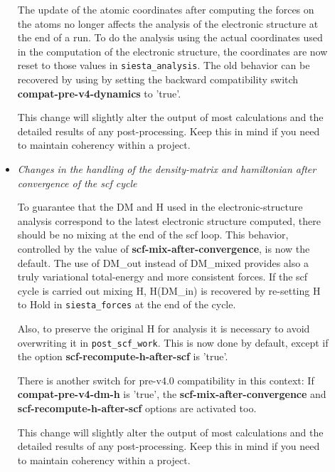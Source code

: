 \documentclass{article}
\newcommand{\opt}[1]{\textbf{#1}}
\newcommand{\code}[1]{\texttt{#1}}
\begin{document}
\begin{description}
\begin{itemize}
  The update of the atomic coordinates after computing the forces on
  the atoms no longer affects the analysis of the electronic
  structure at the end of a run. To do the analysis using the actual
  coordinates used in the computation of the electronic structure, the
  coordinates are now reset to those values in \code{siesta\_analysis}.  The old
  behavior can be recovered by using by setting the backward
  compatibility switch \opt{compat-pre-v4-dynamics} to 'true'.

  This change will slightly alter the output of most calculations and the
  detailed results of any post-processing. Keep this in mind if you
  need to maintain coherency within a project.


  \item\emph{Changes in the handling of the density-matrix and
    hamiltonian after convergence of the scf cycle}

    To guarantee that the DM and H used in the electronic-structure
    analysis correspond to the latest electronic structure computed,
    there should be no mixing at the end of the scf loop. This
    behavior, controlled by the value of \opt{scf-mix-after-convergence}, is
    now the default. The use of DM\_out instead of DM\_mixed provides
    also a truly variational total-energy and more consistent
    forces. If the scf cycle is carried out mixing H, H(DM\_in) is
    recovered by re-setting H to Hold in \code{siesta\_forces} at the end of
    the cycle.

    Also, to preserve the original H for analysis it is necessary to
    avoid overwriting it in \code{post\_scf\_work}. This is now done by
    default, except if the option \opt{scf-recompute-h-after-scf} is
    'true'.

    There is another switch for pre-v4.0 compatibility in this
    context: If \opt{compat-pre-v4-dm-h} is 'true', the
    \opt{scf-mix-after-convergence} and \opt{scf-recompute-h-after-scf}
    options are activated too.

    This change will slightly alter the output of most calculations
    and the detailed results of any post-processing. Keep this in mind
    if you need to maintain coherency within a project.
    
  \end{itemize}

\end{description}
\end{document}
